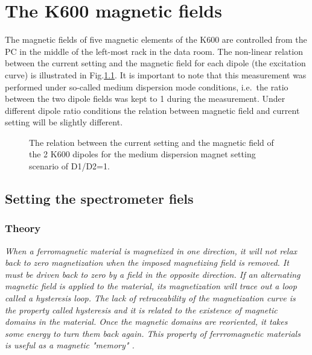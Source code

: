 \documentclass[11pt]{report}
\begin{document}
\newpage
\chapter{The K600 magnetic fields}


The magnetic fields of five magnetic elements of the K600
are controlled from the PC in the middle of the left-most rack in the data room.
The non-linear relation between the current setting and the magnetic field for each dipole (the excitation curve)
is illustrated in Fig.\ref{fig:spectrometer-fields}. 
It is important to note that this measurement was performed under so-called medium dispersion mode
conditions, i.e.~the ratio between the two dipole fields was kept to 1 during the measurement. 
Under different dipole ratio conditions the relation between magnetic field and current setting will be slightly different.

\begin{figure}[!ht]
\centerline{\vspace{0cm}\hspace{0cm}
 }
\centering
\caption{The relation between the current setting and the magnetic field of the 2 K600 dipoles
for the medium dispersion magnet setting scenario of D1/D2=1. }
\label{fig:spectrometer-fields}
\end{figure} 


\section{Setting the spectrometer fiels}\label{sec:Setting-the-spectrometer-fields}

\subsection{Theory}

{\it When a ferromagnetic material is magnetized in one direction, it will not relax back to zero magnetization when the imposed magnetizing field is removed. It must be driven back to zero by a field in the opposite direction. If an alternating magnetic field is applied to the material, its magnetization will trace out a loop called a hysteresis loop. The lack of retraceability of the magnetization curve is the property called hysteresis and it is related to the existence of  magnetic domains in the material. Once the magnetic domains are reoriented, it takes some energy to turn them back again. This property of ferrromagnetic materials is useful as a magnetic "memory" \cite{web10}.}
\end{document}
